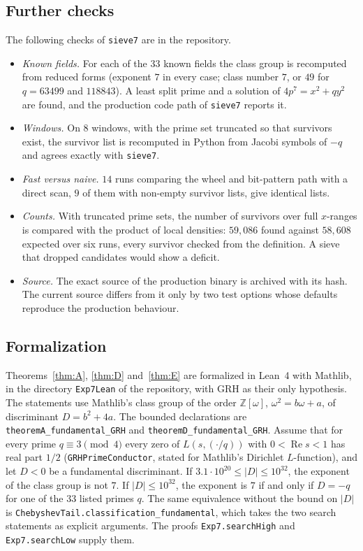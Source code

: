 \documentclass[11pt]{amsart}
\theoremstyle{remark}
\begin{document}
\subsection*{Further checks}
The following checks of \texttt{sieve7} are in the repository.
\begin{itemize}
\item \emph{Known fields.} For each of the $33$ known fields the class group is recomputed from reduced forms (exponent $7$ in every case; class number $7$, or $49$ for $q=63499$ and $118843$). A least split prime and a solution of $4p^7=x^2+qy^2$ are found, and the production code path of \texttt{sieve7} reports it.
\item \emph{Windows.} On $8$ windows, with the prime set truncated so that survivors exist, the survivor list is recomputed in Python from Jacobi symbols of $-q$ and agrees exactly with \texttt{sieve7}.
\item \emph{Fast versus naive.} $14$ runs comparing the wheel and bit-pattern path with a direct scan, $9$ of them with non-empty survivor lists, give identical lists.
\item \emph{Counts.} With truncated prime sets, the number of survivors over full $x$-ranges is compared with the product of local densities: $59{,}086$ found against $58{,}608$ expected over six runs, every survivor checked from the definition. A sieve that dropped candidates would show a deficit.
\item \emph{Source.} The exact source of the production binary is archived with its hash. The current source differs from it only by two test options whose defaults reproduce the production behaviour.
\end{itemize}

\subsection*{Formalization}
Theorems~\ref{thm:A}, \ref{thm:D} and~\ref{thm:E} are formalized in Lean~4 with Mathlib, in the directory \texttt{Exp7Lean} of the repository, with GRH as their only hypothesis. The statements use Mathlib's class group of the order $\mathbb Z[\omega]$, $\omega^2=b\omega+a$, of discriminant $D=b^2+4a$. The bounded declarations are \texttt{theoremA\_\allowbreak fundamental\_\allowbreak GRH} and \texttt{theoremD\_\allowbreak fundamental\_\allowbreak GRH}. Assume that for every prime $q\equiv3\pmod4$ every zero of $L(s,(\cdot/q))$ with $0<\operatorname{Re}s<1$ has real part $1/2$ (\texttt{GRHPrimeConductor}, stated for Mathlib's Dirichlet $L$-function), and let $D<0$ be a fundamental discriminant. If $3.1\cdot10^{20}\le|D|\le10^{32}$, the exponent of the class group is not $7$. If $|D|\le10^{32}$, the exponent is $7$ if and only if $D=-q$ for one of the $33$ listed primes $q$. The same equivalence without the bound on $|D|$ is \texttt{ChebyshevTail.\allowbreak classification\_\allowbreak fundamental}, which takes the two search statements as explicit arguments. The proofs \texttt{Exp7.searchHigh} and \texttt{Exp7.searchLow} supply them.
\end{document}
